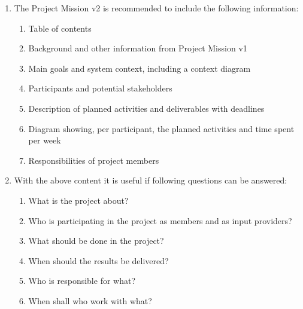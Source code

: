 \documentclass[10pt,a4paper]{article}
\begin{document}
 \begin{enumerate}
  \item The Project Mission v2 is recommended to include the following information:
  \begin{enumerate}
    \item Table of contents
    \item Background and other information from Project Mission v1
    \item Main goals and system context, including a context diagram
    \item Participants and potential stakeholders
    \item Description of planned activities and deliverables with deadlines
    \item Diagram showing, per participant, the planned activities and time spent per week
    \item Responsibilities of project members
  \end{enumerate}
  \item With the above content it is useful if following questions can be answered:
  \begin{enumerate}
   \item What is the project about?
   \item Who is participating in the project as members and as input providers?
   \item What should be done in the project?
   \item When should the results be delivered?
   \item Who is responsible for what?
   \item When shall who work with what?
 \end{enumerate}
\end{enumerate}

\end{document}
